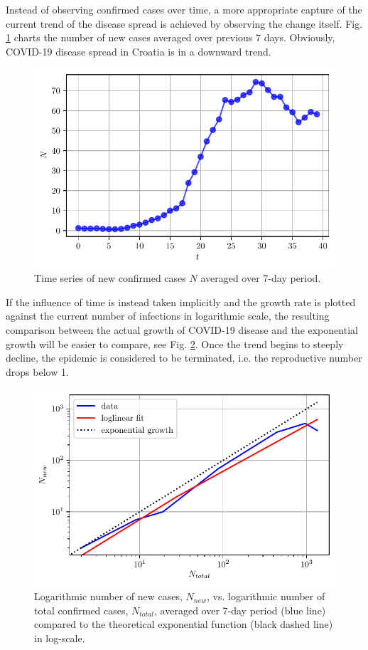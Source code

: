 \documentclass[conference]{IEEEtran}
\begin{document}
Instead of observing confirmed cases over time, a more appropriate capture of the current trend of the disease spread is achieved by observing the change itself. Fig. \ref{fig.newcases} charts the number of new cases averaged over previous 7 days. Obviously, COVID-19 disease spread in Croatia is in a downward trend. 
\begin{figure}[]
    \centering
    \includegraphics[width=\linewidth]{figs/7-day-avg-conf-cases.pdf}
    \caption{Time series of new confirmed cases $N$ averaged over 7-day period.}
    \label{fig.newcases}
\end{figure}
If the influence of time is instead taken implicitly and the growth rate is plotted against the current number of infections in logarithmic scale, the resulting comparison between the actual growth of COVID-19 disease and the exponential growth will be easier to compare, see Fig. \ref{fig.new-v-total}. Once the trend begins to steeply decline, the epidemic is considered to be terminated, i.e. the reproductive number drops below 1. 
\begin{figure}[]
    \centering
    \includegraphics[width=\linewidth]{figs/new-v-total.pdf}
    \caption{Logarithmic number of new cases, $N_{new}$, vs. logarithmic number of total confirmed cases, $N_{total}$, averaged over 7-day period (blue line) compared to the theoretical exponential function (black dashed line) in log-scale.}
    \label{fig.new-v-total}
\end{figure}
\end{document}
